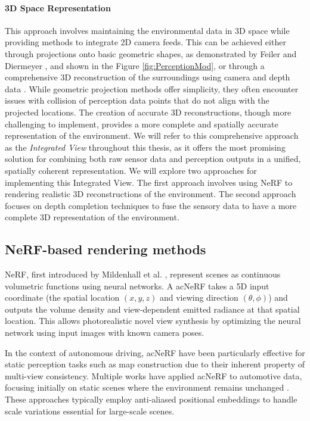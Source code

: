 \paragraph{3D Space Representation} This approach involves maintaining the environmental
data in 3D space while providing methods to integrate 2D camera feeds. This can be
achieved either through projections onto basic geometric shapes, as demonstrated by
Feiler and Diermeyer \cite{Feiler2021ThePM}, and shown in the Figure \ref{fig:PerceptionMod}, or through a comprehensive 3D reconstruction of the surroundings using camera and depth data
. While geometric projection methods offer simplicity, they often encounter issues with collision of perception data points
that do not align with the projected locations. The creation of accurate 3D reconstructions, though more challenging to implement,
provides a more complete and spatially accurate representation of the environment. We will refer to this
comprehensive approach as the \emph{Integrated View} throughout this thesis, as it offers the most promising solution for
combining both raw sensor data and perception outputs in a unified, spatially coherent representation. We will explore
two approaches for implementing this Integrated View. The first approach involves using \ac{NeRF} to rendering
realistic 3D reconstructions of the environment. The second approach focuses on depth completion techniques to fuse the sensory data
to have a more complete 3D representation of the environment.

\subsection{NeRF-based rendering methods}
\ac{NeRF}, first introduced by Mildenhall et al. \cite{mildenhall2020nerf}, represent scenes as continuous volumetric functions using neural networks. A ac{NeRF} takes a 5D input coordinate (the spatial location $(x,y,z)$ and viewing direction $(\theta,\phi)$) and outputs the volume density and view-dependent emitted radiance at that spatial location. This allows photorealistic novel view synthesis by optimizing the neural network using input images with known camera poses.

In the context of autonomous driving, ac{NeRF} have been particularly effective for static perception tasks such as map construction due to their inherent property of multi-view consistency. Multiple works have applied ac{NeRF} to automotive data, focusing initially on static scenes where the environment remains unchanged \cite{snerf2023}. These approaches typically employ anti-aliased positional embeddings to handle scale variations essential for large-scale scenes.

